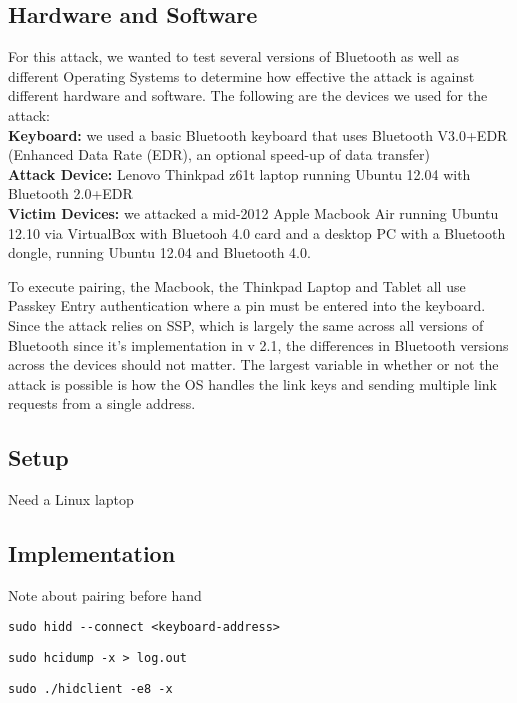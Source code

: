 \documentclass{acm_proc_article-sp}
\begin{document}
\subsection{Hardware and Software}
For this attack, we wanted to test several versions of Bluetooth as well as different Operating Systems to determine how effective the attack is against different hardware and software. The following are the devices we used for the attack:\\
\textbf{Keyboard:} we used a basic Bluetooth keyboard that uses Bluetooth V3.0+EDR (Enhanced Data Rate (EDR), an optional speed-up of data transfer)\\
\textbf{Attack Device:} Lenovo Thinkpad z61t laptop running Ubuntu 12.04 with Bluetooth 2.0+EDR\\
\textbf{Victim Devices:} we attacked a mid-2012 Apple Macbook Air running Ubuntu 12.10 via VirtualBox with
Bluetooh 4.0 card and a desktop PC with a Bluetooth dongle, running Ubuntu 12.04 and Bluetooth 4.0.

To execute pairing, the Macbook, the Thinkpad Laptop and Tablet all use Passkey Entry authentication where a pin must be entered into the keyboard. Since the attack relies on SSP, which is largely the same across all versions of Bluetooth since it's implementation in v 2.1, the differences in Bluetooth versions across the devices should not matter. The largest variable in whether or not the attack is possible is how the OS handles the link keys and sending multiple link requests from a single address. 

\subsection{Setup}
Need a Linux laptop

\subsection{Implementation}
Note about pairing before hand
\begin{verbatim}
sudo hidd --connect <keyboard-address>
\end{verbatim}

\begin{verbatim}
sudo hcidump -x > log.out
\end{verbatim}

\begin{verbatim}
sudo ./hidclient -e8 -x
\end{verbatim}
\end{document}
